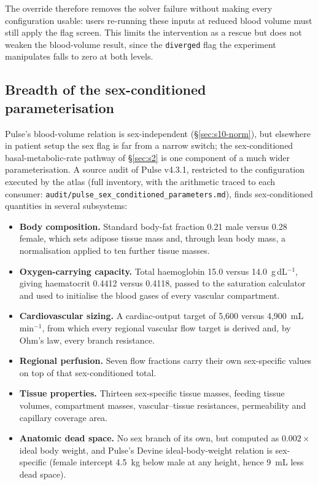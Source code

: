 \documentclass[pdflatex,sn-nature]{sn-jnl}%
\begin{document}
The override therefore removes the solver failure without making every configuration usable: users re-running these inputs at reduced blood volume must still apply the flag screen. This limits the intervention as a rescue but does not weaken the blood-volume result, since the \texttt{diverged} flag the experiment manipulates falls to zero at both levels.

\subsection{Breadth of the sex-conditioned parameterisation}\label{sec:s10-breadth}

Pulse's blood-volume relation is sex-independent (\S\ref{sec:s10-norm}), but elsewhere in patient setup the sex flag is far from a narrow switch; the sex-conditioned basal-metabolic-rate pathway of \S\ref{sec:s2} is one component of a much wider parameterisation. A source audit of Pulse v4.3.1, restricted to the configuration executed by the atlas (full inventory, with the arithmetic traced to each consumer: \texttt{audit/pulse\_sex\_conditioned\_parameters.md}), finds sex-conditioned quantities in several subsystems:

\begin{itemize}
\item \textbf{Body composition.} Standard body-fat fraction 0.21 male versus 0.28 female, which sets adipose tissue mass and, through lean body mass, a normalisation applied to ten further tissue masses.
\item \textbf{Oxygen-carrying capacity.} Total haemoglobin 15.0 versus 14.0~g\,dL$^{-1}$, giving haematocrit 0.4412 versus 0.4118, passed to the saturation calculator and used to initialise the blood gases of every vascular compartment.
\item \textbf{Cardiovascular sizing.} A cardiac-output target of 5{,}600 versus 4{,}900~mL\,min$^{-1}$, from which every regional vascular flow target is derived and, by Ohm's law, every branch resistance.
\item \textbf{Regional perfusion.} Seven flow fractions carry their own sex-specific values on top of that sex-conditioned total.
\item \textbf{Tissue properties.} Thirteen sex-specific tissue masses, feeding tissue volumes, compartment masses, vascular--tissue resistances, permeability and capillary coverage area.
\item \textbf{Anatomic dead space.} No sex branch of its own, but computed as $0.002 \times$ ideal body weight, and Pulse's Devine ideal-body-weight relation is sex-specific (female intercept 4.5~kg below male at any height, hence 9~mL less dead space).
\end{itemize}
\end{document}
